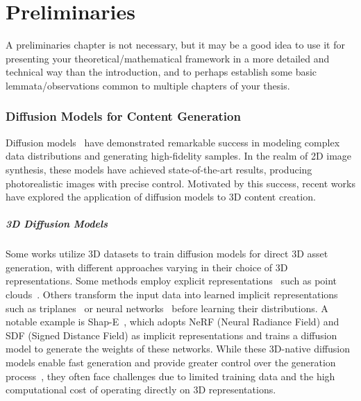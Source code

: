 \chapter{Preliminaries}
\label{chap:prelims}

A preliminaries chapter is not necessary, but it may be a good idea to use it for presenting your theoretical/mathematical framework in a more detailed and technical way than the introduction, and to perhaps establish some basic lemmata/observations common to multiple chapters of your thesis.

\subsection{Diffusion Models for Content Generation}
Diffusion models~\cite{ho2020denoising, rombach2022highresolutionimagesynthesislatent, saharia2022photorealistictexttoimagediffusionmodels} have demonstrated remarkable success in modeling complex data distributions and generating high-fidelity samples. In the realm of 2D image synthesis, these models have achieved state-of-the-art results, producing photorealistic images with precise control. Motivated by this success, recent works have explored the application of diffusion models to 3D content creation.

\vspace{-14pt}
 \paragraph{3D Diffusion Models}
Some works utilize 3D datasets to train diffusion models for direct 3D asset generation, with different approaches varying in their choice of 3D representations. Some methods employ explicit representations~\cite{zhang2024gaussiancubestructuredexplicitradiance, yariv2024mosaicsdf3dgenerativemodels} such as point clouds~\cite{schröppel2024neuralpointclouddiffusion, nichol2022pointe, zhou20213dshapegenerationcompletion, lyu2023controllablemeshgenerationsparse, NEURIPS2022_40e56dab}. Others transform the input data into learned implicit representations such as triplanes~\cite{shue20223dneuralfieldgeneration,gupta20233dgentriplanelatentdiffusion, chen2023singlestagediffusionnerfunified} or neural networks~\cite{li2023diffusionsdftexttoshapevoxelizeddiffusion, hui2022neuralwaveletdomaindiffusion3d} before learning their distributions. A notable example is Shap-E~\cite{jun2023shape}, which adopts NeRF (Neural Radiance Field) and SDF (Signed Distance Field) as implicit representations and trains a diffusion model to generate the weights of these networks. While these 3D-native diffusion models enable fast generation and provide greater control over the generation process~\cite{sella2024spicee}, they often face challenges due to limited training data and the high computational cost of operating directly on 3D representations.

